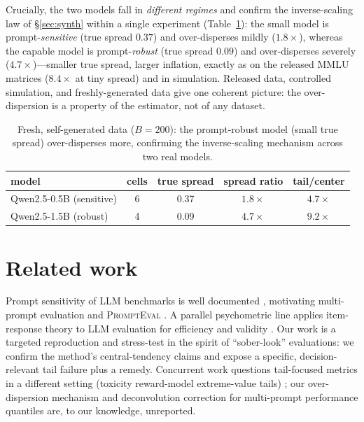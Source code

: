 \documentclass[11pt]{article}
\newcommand{\pe}{\textsc{PromptEval}}
\begin{document}
Crucially, the two models fall in \emph{different regimes} and confirm the inverse-scaling law
of \S\ref{sec:synth} within a single experiment (Table~\ref{tab:fresh}): the small model is
prompt-\emph{sensitive} (true spread $0.37$) and over-disperses mildly ($1.8\times$), whereas the
capable model is prompt-\emph{robust} (true spread $0.09$) and over-disperses severely
($4.7\times$)---smaller true spread, larger inflation, exactly as on the released MMLU matrices
($8.4\times$ at tiny spread) and in simulation. Released data, controlled simulation, and
freshly-generated data give one coherent picture: the over-dispersion is a property of the
estimator, not of any dataset.

\begin{table}[h]\centering\small
\caption{Fresh, self-generated data ($B{=}200$): the prompt-robust model (small true spread)
over-disperses more, confirming the inverse-scaling mechanism across two real models.}
\label{tab:fresh}
\begin{tabular}{lcccc}
\toprule
model & cells & true spread & spread ratio & tail/center \\
\midrule
Qwen2.5-0.5B (sensitive) & 6 & 0.37 & $1.8\times$ & $4.7\times$ \\
Qwen2.5-1.5B (robust)    & 4 & 0.09 & $4.7\times$ & $9.2\times$ \\
\bottomrule
\end{tabular}
\end{table}

\section{Related work}
Prompt sensitivity of LLM benchmarks is well documented
\citep{sclar2024quantifying,mizrahi2024state}, motivating multi-prompt evaluation and \pe{}
\citep{polo2024prompteval}. A parallel psychometric line applies item-response theory to LLM
evaluation for efficiency and validity \citep{madaan2024quantifying}. Our work is a targeted
reproduction and stress-test in the spirit of ``sober-look'' evaluations: we confirm the
method's central-tendency claims and expose a specific, decision-relevant tail failure plus a
remedy. Concurrent work questions tail-focused metrics in a different setting (toxicity
reward-model extreme-value tails) \citep{tailfragile2026}; our over-dispersion mechanism and
deconvolution correction for multi-prompt performance quantiles are, to our knowledge,
unreported.
\end{document}
